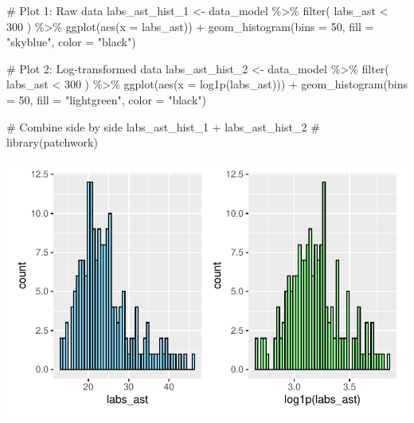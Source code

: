 \documentclass[
  12pt,
]{article}
\newenvironment{Shaded}{\begin{snugshade}}{\end{snugshade}}
\newcommand{\AttributeTok}[1]{\textcolor[rgb]{0.40,0.45,0.13}{#1}}
\newcommand{\CommentTok}[1]{\textcolor[rgb]{0.37,0.37,0.37}{#1}}
\newcommand{\DecValTok}[1]{\textcolor[rgb]{0.68,0.00,0.00}{#1}}
\newcommand{\FunctionTok}[1]{\textcolor[rgb]{0.28,0.35,0.67}{#1}}
\newcommand{\NormalTok}[1]{\textcolor[rgb]{0.00,0.23,0.31}{#1}}
\newcommand{\OtherTok}[1]{\textcolor[rgb]{0.00,0.23,0.31}{#1}}
\newcommand{\SpecialCharTok}[1]{\textcolor[rgb]{0.37,0.37,0.37}{#1}}
\newcommand{\StringTok}[1]{\textcolor[rgb]{0.13,0.47,0.30}{#1}}
\begin{document}
\begin{Shaded}
\begin{Highlighting}[]
\CommentTok{\# Plot 1: Raw data}
\NormalTok{labs\_ast\_hist\_1 }\OtherTok{\textless{}{-}}\NormalTok{ data\_model }\SpecialCharTok{\%\textgreater{}\%} 
    \FunctionTok{filter}\NormalTok{(}
\NormalTok{        labs\_ast }\SpecialCharTok{\textless{}} \DecValTok{300}
\NormalTok{    ) }\SpecialCharTok{\%\textgreater{}\%} 
    \FunctionTok{ggplot}\NormalTok{(}\FunctionTok{aes}\NormalTok{(}\AttributeTok{x =}\NormalTok{ labs\_ast)) }\SpecialCharTok{+} 
    \FunctionTok{geom\_histogram}\NormalTok{(}\AttributeTok{bins =} \DecValTok{50}\NormalTok{, }\AttributeTok{fill =} \StringTok{"skyblue"}\NormalTok{, }\AttributeTok{color =} \StringTok{"black"}\NormalTok{)}

\CommentTok{\# Plot 2: Log{-}transformed data}
\NormalTok{labs\_ast\_hist\_2 }\OtherTok{\textless{}{-}}\NormalTok{ data\_model }\SpecialCharTok{\%\textgreater{}\%} 
    \FunctionTok{filter}\NormalTok{(}
\NormalTok{        labs\_ast }\SpecialCharTok{\textless{}} \DecValTok{300}
\NormalTok{    ) }\SpecialCharTok{\%\textgreater{}\%}
    \FunctionTok{ggplot}\NormalTok{(}\FunctionTok{aes}\NormalTok{(}\AttributeTok{x =} \FunctionTok{log1p}\NormalTok{(labs\_ast))) }\SpecialCharTok{+} 
    \FunctionTok{geom\_histogram}\NormalTok{(}\AttributeTok{bins =} \DecValTok{50}\NormalTok{, }\AttributeTok{fill =} \StringTok{"lightgreen"}\NormalTok{, }\AttributeTok{color =} \StringTok{"black"}\NormalTok{)}

\CommentTok{\# Combine side by side}
\NormalTok{labs\_ast\_hist\_1 }\SpecialCharTok{+}\NormalTok{ labs\_ast\_hist\_2 }\CommentTok{\# library(patchwork)}
\end{Highlighting}
\end{Shaded}

\includegraphics{Outcomes_files/figure-pdf/labs_ast_1-1.pdf}
\end{document}
